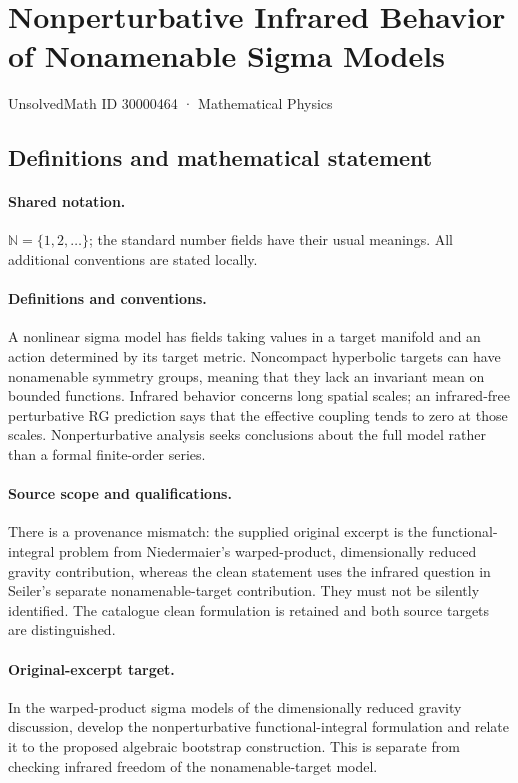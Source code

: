 \documentclass[11pt]{article}
\begin{document}
\setcounter{section}{30000463}
\section{Nonperturbative Infrared Behavior of Nonamenable Sigma Models}\label{30000464}
{\small UnsolvedMath ID 30000464 · Mathematical Physics}
\subsection{Definitions and mathematical statement}

\paragraph{Shared notation.}$\mathbb N=\{1,2,\ldots\}$; the standard number fields have their usual meanings. All additional conventions are stated locally.


\paragraph{Definitions and conventions.} A nonlinear sigma model has fields taking values in a target manifold and an action determined by its target metric. Noncompact hyperbolic targets can have nonamenable symmetry groups, meaning that they lack an invariant mean on bounded functions. Infrared behavior concerns long spatial scales; an infrared-free perturbative RG prediction says that the effective coupling tends to zero at those scales. Nonperturbative analysis seeks conclusions about the full model rather than a formal finite-order series.

\paragraph{Source scope and qualifications.} There is a provenance mismatch: the supplied original excerpt is the functional-integral problem from Niedermaier's warped-product, dimensionally reduced gravity contribution, whereas the clean statement uses the infrared question in Seiler's separate nonamenable-target contribution. They must not be silently identified. The catalogue clean formulation is retained and both source targets are distinguished.

\paragraph{Original-excerpt target.} In the warped-product sigma models of the dimensionally reduced gravity discussion, develop the nonperturbative functional-integral formulation and relate it to the proposed algebraic bootstrap construction. This is separate from checking infrared freedom of the nonamenable-target model.
\end{document}
